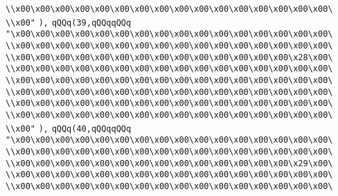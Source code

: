 \verb|\\x00\x00\x00\x00\x00\x00\x00\x00\x00\x00\x00\x00\x00\x00\x00\x00\|\newline
\verb|\\x00"|\newline
\verb|),|\newline
\verb|qQQq(39,qQQqqQQq|\newline
\verb|"\x00\x00\x00\x00\x00\x00\x00\x00\x00\x00\x00\x00\x00\x00\x00\x00\|\newline
\verb|\\x00\x00\x00\x00\x00\x00\x00\x00\x00\x00\x00\x00\x00\x00\x00\x00\|\newline
\verb|\\x00\x00\x00\x00\x00\x00\x00\x00\x00\x00\x00\x00\x00\x00\x28\x00\|\newline
\verb|\\x00\x00\x00\x00\x00\x00\x00\x00\x00\x00\x00\x00\x00\x00\x00\x00\|\newline
\verb|\\x00\x00\x00\x00\x00\x00\x00\x00\x00\x00\x00\x00\x00\x00\x00\x00\|\newline
\verb|\\x00\x00\x00\x00\x00\x00\x00\x00\x00\x00\x00\x00\x00\x00\x00\x00\|\newline
\verb|\\x00\x00\x00\x00\x00\x00\x00\x00\x00\x00\x00\x00\x00\x00\x00\x00\|\newline
\verb|\\x00\x00\x00\x00\x00\x00\x00\x00\x00\x00\x00\x00\x00\x00\x00\x00\|\newline
\verb|\\x00"|\newline
\verb|),|\newline
\verb|qQQq(40,qQQqqQQq|\newline
\verb|"\x00\x00\x00\x00\x00\x00\x00\x00\x00\x00\x00\x00\x00\x00\x00\x00\|\newline
\verb|\\x00\x00\x00\x00\x00\x00\x00\x00\x00\x00\x00\x00\x00\x00\x00\x00\|\newline
\verb|\\x00\x00\x00\x00\x00\x00\x00\x00\x00\x00\x00\x00\x00\x00\x29\x00\|\newline
\verb|\\x00\x00\x00\x00\x00\x00\x00\x00\x00\x00\x00\x00\x00\x00\x00\x00\|\newline
\verb|\\x00\x00\x00\x00\x00\x00\x00\x00\x00\x00\x00\x00\x00\x00\x00\x00\|\newline
